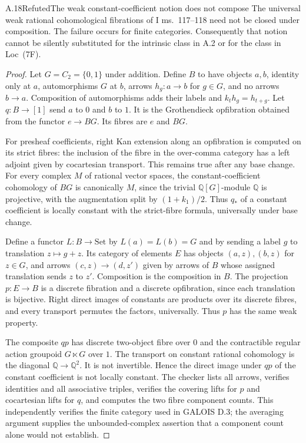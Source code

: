 \begin{claim}{A.18}{Refuted}{The weak constant-coefficient notion does not compose}
The universal weak rational cohomological fibrations of I ms.~117--118 need not be closed under composition. The failure occurs for finite categories. Consequently that notion cannot be silently substituted for the intrinsic class in A.2 or for the class in Loc~(7F).
\end{claim}
\begin{proof}
Let $G=C_2=\{0,1\}$ under addition. Define $B$ to have objects $a,b$, identity only at $a$, automorphisms $G$ at $b$, arrows $h_g:a\to b$ for $g\in G$, and no arrows $b\to a$. Composition of automorphisms adds their labels and $k_t h_g=h_{t+g}$. Let $q:B\to[1]$ send $a$ to $0$ and $b$ to $1$. It is the Grothendieck opfibration obtained from the functor $e\to BG$. Its fibres are $e$ and $BG$.

For presheaf coefficients, right Kan extension along an opfibration is computed on its strict fibres: the inclusion of the fibre in the over-comma category has a left adjoint given by cocartesian transport. This remains true after any base change. For every complex $M$ of rational vector spaces, the constant-coefficient cohomology of $BG$ is canonically $M$, since the trivial $\mathbb Q[G]$-module $\mathbb Q$ is projective, with the augmentation split by $(1+k_1)/2$. Thus $q_*$ of a constant coefficient is locally constant with the strict-fibre formula, universally under base change.

Define a functor $L:B\to\mathrm{Set}$ by $L(a)=L(b)=G$ and by sending a label $g$ to translation $z\mapsto g+z$. Its category of elements $E$ has objects $(a,z),(b,z)$ for $z\in G$, and arrows $(c,z)\to(d,z')$ given by arrows of $B$ whose assigned translation sends $z$ to $z'$. Composition is the composition in $B$. The projection $p:E\to B$ is a discrete fibration and a discrete opfibration, since each translation is bijective. Right direct images of constants are products over its discrete fibres, and every transport permutes the factors, universally. Thus $p$ has the same weak property.

The composite $qp$ has discrete two-object fibre over $0$ and the contractible regular action groupoid $G\ltimes G$ over $1$. The transport on constant rational cohomology is the diagonal $\mathbb Q\to\mathbb Q^2$. It is not invertible. Hence the direct image under $qp$ of the constant coefficient is not locally constant. The checker lists all arrows, verifies identities and all associative triples, verifies the covering lifts for $p$ and cocartesian lifts for $q$, and computes the two fibre component counts. This independently verifies the finite category used in GALOIS D.3; the averaging argument supplies the unbounded-complex assertion that a component count alone would not establish.
\end{proof}

